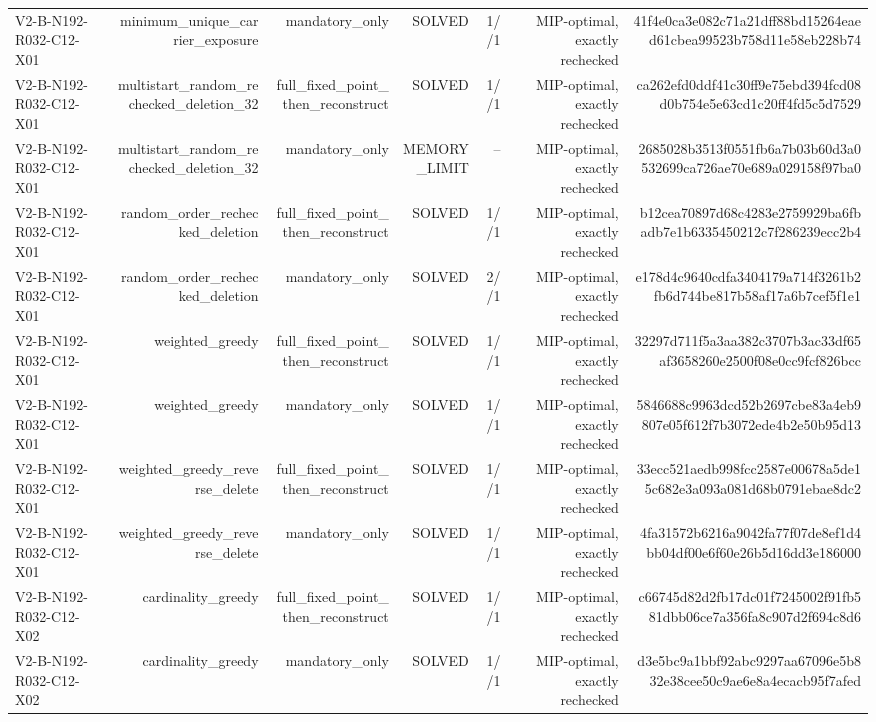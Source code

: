 {\begin{longtable}{lrrrrrr}
V2-B-N192-R032-C12-X01 & minimum\_unique\_carrier\_exposure & mandatory\_only & SOLVED & 1//1 & MIP-optimal, exactly rechecked & 41f4e0ca3e082c71a21dff88bd15264eaed61cbea99523b758d11e58eb228b74 \\
V2-B-N192-R032-C12-X01 & multistart\_random\_rechecked\_deletion\_32 & full\_fixed\_point\_then\_reconstruct & SOLVED & 1//1 & MIP-optimal, exactly rechecked & ca262efd0ddf41c30ff9e75ebd394fcd08d0b754e5e63cd1c20ff4fd5c5d7529 \\
V2-B-N192-R032-C12-X01 & multistart\_random\_rechecked\_deletion\_32 & mandatory\_only & MEMORY\_LIMIT & -- & MIP-optimal, exactly rechecked & 2685028b3513f0551fb6a7b03b60d3a0532699ca726ae70e689a029158f97ba0 \\
V2-B-N192-R032-C12-X01 & random\_order\_rechecked\_deletion & full\_fixed\_point\_then\_reconstruct & SOLVED & 1//1 & MIP-optimal, exactly rechecked & b12cea70897d68c4283e2759929ba6fbadb7e1b6335450212c7f286239ecc2b4 \\
V2-B-N192-R032-C12-X01 & random\_order\_rechecked\_deletion & mandatory\_only & SOLVED & 2//1 & MIP-optimal, exactly rechecked & e178d4c9640cdfa3404179a714f3261b2fb6d744be817b58af17a6b7cef5f1e1 \\
V2-B-N192-R032-C12-X01 & weighted\_greedy & full\_fixed\_point\_then\_reconstruct & SOLVED & 1//1 & MIP-optimal, exactly rechecked & 32297d711f5a3aa382c3707b3ac33df65af3658260e2500f08e0cc9fcf826bcc \\
V2-B-N192-R032-C12-X01 & weighted\_greedy & mandatory\_only & SOLVED & 1//1 & MIP-optimal, exactly rechecked & 5846688c9963dcd52b2697cbe83a4eb9807e05f612f7b3072ede4b2e50b95d13 \\
V2-B-N192-R032-C12-X01 & weighted\_greedy\_reverse\_delete & full\_fixed\_point\_then\_reconstruct & SOLVED & 1//1 & MIP-optimal, exactly rechecked & 33ecc521aedb998fcc2587e00678a5de15c682e3a093a081d68b0791ebae8dc2 \\
V2-B-N192-R032-C12-X01 & weighted\_greedy\_reverse\_delete & mandatory\_only & SOLVED & 1//1 & MIP-optimal, exactly rechecked & 4fa31572b6216a9042fa77f07de8ef1d4bb04df00e6f60e26b5d16dd3e186000 \\
V2-B-N192-R032-C12-X02 & cardinality\_greedy & full\_fixed\_point\_then\_reconstruct & SOLVED & 1//1 & MIP-optimal, exactly rechecked & c66745d82d2fb17dc01f7245002f91fb581dbb06ce7a356fa8c907d2f694c8d6 \\
V2-B-N192-R032-C12-X02 & cardinality\_greedy & mandatory\_only & SOLVED & 1//1 & MIP-optimal, exactly rechecked & d3e5bc9a1bbf92abc9297aa67096e5b832e38cee50c9ae6e8a4ecacb95f7afed \\

\end{longtable}}
